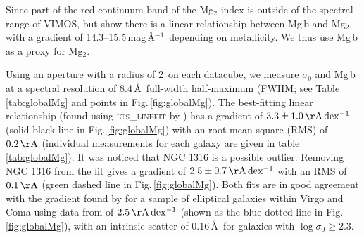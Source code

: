 			Since part of the red continuum band of the Mg$_2$ index is outside of the spectral range of VIMOS, but \citet{Ziegler1997} show there is a linear relationship between Mg\,b and Mg$_2$, with a gradient of 14.3--15.5\,mag\,\AA$^{-1}$\ depending on metallicity. We thus use Mg\,b as a proxy for Mg$_2$. 

			Using an aperture with a radius of 2\arcsec\ on each datacube, we measure $\sigma_0$ and Mg\,b at a spectral resolution of 8.4\,\AA\ full-width half-maximum (FWHM; see Table \ref{tab:globalMg} and points in Fig.\,\ref{fig:globalMg}). The best-fitting linear relationship (found using \textsc{lts\_linefit} by \citealt{Cappellari2013}) has a gradient of $3.3 \pm 1.0 \,\mathrm{\AA\,dex^{-1}}$ (solid black line in Fig.\,\ref{fig:globalMg}) with an root-mean-square (RMS) of $0.2 \, \mathrm{\AA}$ (individual measurements for each galaxy are given in table \ref{tab:globalMg}). It was noticed that NGC 1316 is a possible outlier. Removing NGC 1316 from the fit gives a gradient of $2.5 \pm 0.7 \,\mathrm{\AA\,dex^{-1}}$ with an RMS of $0.1 \, \mathrm{\AA}$ (green dashed line in Fig.\,\ref{fig:globalMg}). Both fits are in good agreement with the gradient found by \citet{Ziegler1997} for a sample of elliptical galaxies within Virgo and Coma using data from \citet{Dressler1987} of $2.5\,\mathrm{\AA\,dex^{-1}}$ (shown as the blue dotted line in Fig.\,\ref{fig:globalMg}), with an intrinsic scatter of 0.16\,\AA\ for galaxies with $\log \sigma_0 \geqslant 2.3$. 


			


